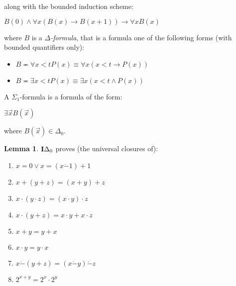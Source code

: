 \documentclass[8pt]{article}
\theoremstyle{definition}
\theoremstyle{definition}
\theoremstyle{definition}
\theoremstyle{definition}
\theoremstyle{definition}
\theoremstyle{definition}
\theoremstyle{definition}
\theoremstyle{definition}
\newtheorem{lemma}{Lemma}[section]
\theoremstyle{definition}
\theoremstyle{definition}
\theoremstyle{definition}
\theoremstyle{definition}
\theoremstyle{definition}
\theoremstyle{question}
\begin{document}
along with the bounded induction scheme:
\begin{center}
  $B(0) \land \forall x (B (x) \to B(x + 1)) \to \forall x B(x)$
\end{center}
where $B$ is a \emph{$\Delta$-formula}, that is a formula one of the following forms (with bounded quantifiers only):
\begin{itemize}
  \item $B \eqcirc \forall x < t P(x) \equiv \forall x (x < t \to P(x))$ 
  \item $B \eqcirc \exists x < t P(x) \equiv \exists x (x < t \land P(x))$
\end{itemize}

A $\Sigma_1$-formula is a formula of the form:
\begin{center}
  $\exists \vec{x} B(\vec{x})$
\end{center}
where $B(\vec{x}) \in \Delta_0$.

\begin{lemma}
  ${\bf I}\Delta_0$ proves (the universal closures of):
  \begin{enumerate}
    \item $x = 0 \lor x = (x \dot{-} 1) + 1$
    \item $x + (y + z) = (x + y) + z$
    \item $x \cdot (y \cdot z) = (x \cdot y) \cdot z$
    \item $x \cdot (y + z) = x \cdot y + x \cdot z$
    \item $x + y = y + x$
    \item $x \cdot y = y \cdot x$
    \item $x \dot{-} (y + z) = (x \dot{-} y) \dot{-} z$
    \item $2^{x + y} = 2^x \cdot 2^y$
  \end{enumerate}
\end{lemma}
\end{document}
